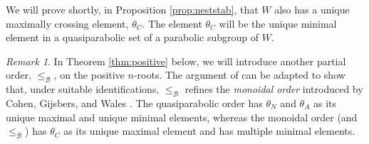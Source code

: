 \documentclass[11pt]{amsart}
\theoremstyle{plain}
\theoremstyle{definition}
\theoremstyle{remark}
\newtheorem{rmk}[theorem]{Remark}
\numberwithin{equation}{subsection}
\newcommand{\Be}{\mathcal B}
\begin{document}
We will prove shortly, in Proposition \ref{prop:neststab}, that $W$ also has a
unique maximally crossing element, $\theta_C$. The element $\theta_C$ will be
the unique minimal element in a quasiparabolic set of a parabolic subgroup of
$W$.

\begin{rmk}
    \label{rmk:monoidal}
In Theorem \ref{thm:positive} below, we will introduce another partial order,
$\leq_\Be$, on the positive $n$-roots. The argument of \cite[Section 6]{gx3} can
be adapted to show that, under suitable identifications, $\leq_\Be$ refines the
{\it monoidal order} introduced by Cohen, Gijsbers, and Wales \cite[Section
3]{cohen06}.  The quasiparabolic order has $\theta_N$ and $\theta_A$ as its
unique maximal and unique minimal elements, whereas the monoidal order (and
$\leq_\Be$) has $\theta_C$ as its unique maximal element and has multiple
minimal elements.
\end{rmk}

\end{document}
